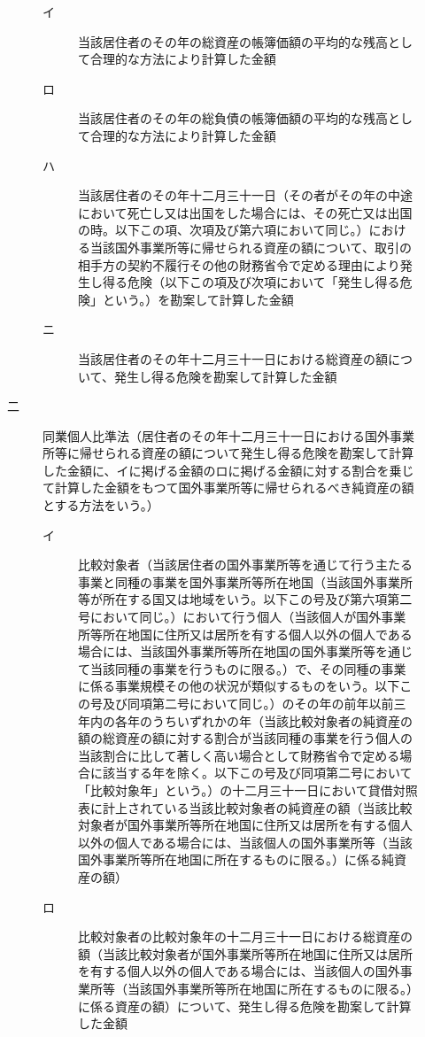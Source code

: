 \documentclass[twocolumn,a4j,10pt]{ltjtarticle}
\begin{document}
\begin{description}
\begin{description}
\begin{description}
\item[イ]当該居住者のその年の総資産の帳簿価額の平均的な残高として合理的な方法により計算した金額
\item[ロ]当該居住者のその年の総負債の帳簿価額の平均的な残高として合理的な方法により計算した金額
\item[ハ]当該居住者のその年十二月三十一日（その者がその年の中途において死亡し又は出国をした場合には、その死亡又は出国の時。以下この項、次項及び第六項において同じ。）における当該国外事業所等に帰せられる資産の額について、取引の相手方の契約不履行その他の財務省令で定める理由により発生し得る危険（以下この項及び次項において「発生し得る危険」という。）を勘案して計算した金額
\item[ニ]当該居住者のその年十二月三十一日における総資産の額について、発生し得る危険を勘案して計算した金額
\end{description}
\item[二]同業個人比準法（居住者のその年十二月三十一日における国外事業所等に帰せられる資産の額について発生し得る危険を勘案して計算した金額に、イに掲げる金額のロに掲げる金額に対する割合を乗じて計算した金額をもつて国外事業所等に帰せられるべき純資産の額とする方法をいう。）
\begin{description}
\item[イ]比較対象者（当該居住者の国外事業所等を通じて行う主たる事業と同種の事業を国外事業所等所在地国（当該国外事業所等が所在する国又は地域をいう。以下この号及び第六項第二号において同じ。）において行う個人（当該個人が国外事業所等所在地国に住所又は居所を有する個人以外の個人である場合には、当該国外事業所等所在地国の国外事業所等を通じて当該同種の事業を行うものに限る。）で、その同種の事業に係る事業規模その他の状況が類似するものをいう。以下この号及び同項第二号において同じ。）のその年の前年以前三年内の各年のうちいずれかの年（当該比較対象者の純資産の額の総資産の額に対する割合が当該同種の事業を行う個人の当該割合に比して著しく高い場合として財務省令で定める場合に該当する年を除く。以下この号及び同項第二号において「比較対象年」という。）の十二月三十一日において貸借対照表に計上されている当該比較対象者の純資産の額（当該比較対象者が国外事業所等所在地国に住所又は居所を有する個人以外の個人である場合には、当該個人の国外事業所等（当該国外事業所等所在地国に所在するものに限る。）に係る純資産の額）
\item[ロ]比較対象者の比較対象年の十二月三十一日における総資産の額（当該比較対象者が国外事業所等所在地国に住所又は居所を有する個人以外の個人である場合には、当該個人の国外事業所等（当該国外事業所等所在地国に所在するものに限る。）に係る資産の額）について、発生し得る危険を勘案して計算した金額

\end{description}
\end{description}
\end{description}
\end{document}
